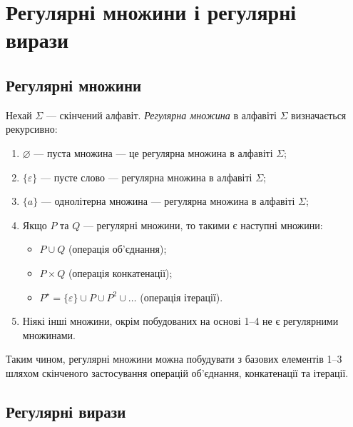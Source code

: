 \setcounter{section}{4}

\section{Регулярні множини і регулярні вирази}

\subsection{Регулярні множини}

Нехай $\Sigma$ --- скінчений алфавіт. \textit{Регулярна множина} в алфавіті $\Sigma$ визначається рекурсивно:
\begin{enumerate}
	\item $\varnothing$ --- пуста множина --- це регулярна множина в алфавіті $\Sigma$;
	\item $\{\varepsilon\}$ --- пусте слово --- регулярна множина в алфавіті $\Sigma$;
	\item $\{a\}$ --- однолітерна множина --- регулярна множина в алфавіті $\Sigma$;
	\item Якщо $P$ та $Q$ --- регулярні множини, то такими є наступні множини:
	\begin{itemize}
		\item $P \cup Q$ (операція об'єднання);
		\item $P \times Q$ (операція конкатенації);
		\item $P^\star = \{\varepsilon\} \cup P \cup P^2 \cup \ldots$ (операція ітерації).
	\end{itemize}
	\item Ніякі інші множини, окрім побудованих на основі 1--4 не є регулярними множинами.
\end{enumerate}

Таким чином, регулярні множини можна побудувати з базових елементів 1--3 шляхом скінченого застосування операцій об'єднання, конкатенації та ітерації.

\subsection{Регулярні вирази}

